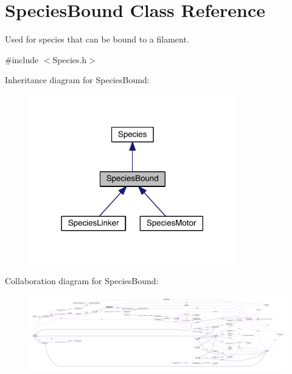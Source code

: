 \hypertarget{classSpeciesBound}{\section{Species\+Bound Class Reference}
\label{classSpeciesBound}
}


Used for species that can be bound to a filament.  




{\ttfamily \#include $<$Species.\+h$>$}



Inheritance diagram for Species\+Bound\+:\nopagebreak
\begin{figure}[H]
\begin{center}
\leavevmode
\includegraphics[width=254pt]{classSpeciesBound__inherit__graph}
\end{center}
\end{figure}


Collaboration diagram for Species\+Bound\+:
\nopagebreak
\begin{figure}[H]
\begin{center}
\leavevmode
\includegraphics[width=350pt]{classSpeciesBound__coll__graph}
\end{center}
\end{figure}

